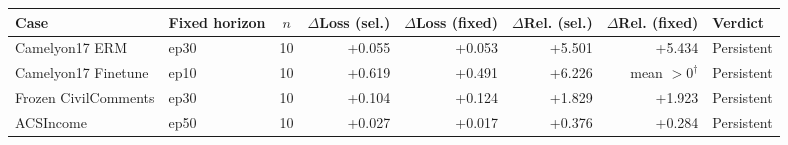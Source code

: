 \begin{tabular}{llcrrrrl}
  \toprule
  Case & Fixed horizon & $n$ & $\Delta$Loss (sel.) & $\Delta$Loss (fixed) & $\Delta$Rel. (sel.) & $\Delta$Rel. (fixed) & Verdict \\
  \midrule
  Camelyon17 ERM & ep30 & 10 & +0.055 & +0.053 & +5.501 & +5.434 & Persistent \\
  Camelyon17 Finetune & ep10 & 10 & +0.619 & +0.491 & +6.226 & mean $>0^{\dagger}$ & Persistent \\
  Frozen CivilComments & ep30 & 10 & +0.104 & +0.124 & +1.829 & +1.923 & Persistent \\
  ACSIncome & ep50 & 10 & +0.027 & +0.017 & +0.376 & +0.284 & Persistent \\
  \bottomrule
\end{tabular}
